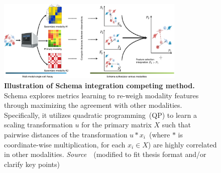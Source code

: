 \begin{description}
\begin{figure}[!h]
  	\centering
  	\includegraphics[width=0.8\textwidth]{Alg_Schema/fig}
  	\vspace{0.1cm}
  	\caption[Illustration of Schema integration competing method.]{\textbf{Illustration of Schema integration competing method.} Schema explores metrics learning to re-weigh modality features through maximizing the agreement with other modalities. Specifically, it utilizes quadratic programming~(QP) to learn a scaling transformation $u$ for the primary matrix $X$ such that pairwise distances of the transformation $u * x_i$~(where $*$ is coordinate-wise multiplication, for each $x_i\in X$) are highly correlated in other modalities. \emph{Source~\cite{singh2021schema}}~(modified to fit thesis format and/or clarify key points)
 } 
  	\label{fig:Alg_Schema}
\end{figure} 


\end{description}
